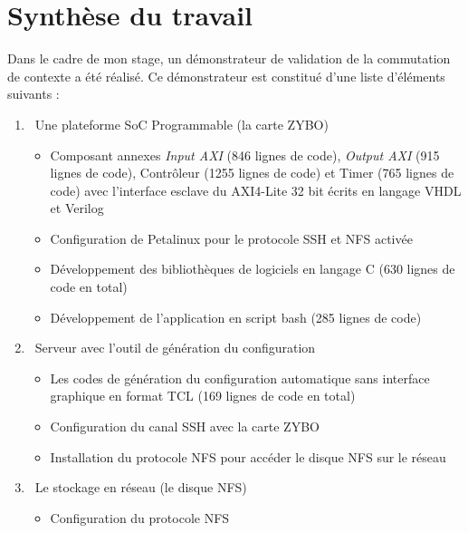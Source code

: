 \section{Synthèse du travail}
\label{sec:synthese}
Dans le cadre de mon stage, un démonstrateur de validation de la commutation de contexte a été réalisé. 
Ce démonstrateur est constitué d'une liste d'éléments suivants :
\begin{enumerate}
	\item\
	Une plateforme SoC Programmable (la carte ZYBO)
	\begin{itemize}
		\item
		
		Composant annexes \emph{Input AXI} (846 lignes de code), \emph{Output AXI} 
		(915 lignes de code), Contrôleur (1255 lignes de code) et Timer (765 lignes de code)
		avec l'interface esclave du AXI4-Lite 32 bit écrits en langage VHDL et Verilog
		
		\item
		
		Configuration de Petalinux pour le protocole SSH et NFS activée
		
		\item
		
		Développement des bibliothèques de logiciels en langage C (630 lignes de code en total)
		
		\item
		
		Développement de l'application en script bash (285 lignes de code)
		
	\end{itemize}
	\item\
	Serveur avec l'outil de génération du configuration
	
	\begin{itemize}
		\item
		
		Les codes de génération du configuration automatique sans interface graphique en format \gls{TCL}
		(169 lignes de code en total)
		
		\item
		
		Configuration du canal SSH avec la carte ZYBO
		
		\item
		
		Installation du protocole NFS pour accéder le disque NFS sur le réseau
		
	\end{itemize}
	\item\
	Le stockage en réseau (le disque NFS)
	
	\begin{itemize}
		\item
		
		Configuration du protocole NFS
	\end{itemize}
\end{enumerate}
